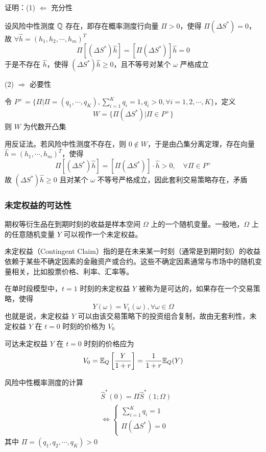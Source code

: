证明：(1) $\Leftarrow$ 充分性

设风险中性测度 $\mathbb{Q}$ 存在，即存在概率测度行向量 $\Pi>0$，使得 $\Pi(\Delta S^*)=0$，故 $\forall \hat{h}=(h_1,h_2,\cdots,h_m)^T$
\[
\Pi[(\Delta S^*)\hat{h}]=[\Pi(\Delta S^*)]\hat{h}=0
\]
于是不存在 $\hat{h}$，使得 $(\Delta S^*)\hat{h}\geq 0$，且不等号对某个 $\omega$ 严格成立

(2) $\Rightarrow$ 必要性

令 $P^+=\{\Pi|\Pi=(q_1,\cdots,q_K),\sum_{i=1}^Kq_i=1,q_i>0,\forall i=1,2,\cdots,K\}$，定义
\[
W=\{\Pi(\Delta S^*)|\Pi\in P^+\}
\]
则 $W$ 为代数开凸集

用反证法。若风险中性测度不存在，则 $0\notin W$，于是由凸集分离定理，存在向量 $\hat{h}=(h_1,\cdots,h_m)^T$，使得
\[
\Pi[(\Delta S^*)\hat{h}]=[\Pi(\Delta S^*)]\cdot \hat{h}>0,\quad \forall \Pi\in P^+
\]
故 $(\Delta S^*)\hat{h}\geq 0$ 且对某个 $\omega$ 不等号严格成立，因此套利交易策略存在，矛盾

\subsubsection{未定权益的可达性}

期权等衍生品在到期时刻的收益是样本空间 $\Omega$ 上的一个随机变量。一般地，$\Omega$ 上的任意随机变量 $Y$ 可以视作一个未定权益。

\begin{definition}[未定权益]
    未定权益（Contingent Claim）指的是在未来某一时刻（通常是到期时刻）的收益依赖于某些不确定因素的金融资产或合约。这些不确定因素通常与市场中的随机变量相关，比如股票价格、利率、汇率等。
\end{definition}

\begin{definition}[可达性]
    在单时段模型中，$t=1$ 时刻的未定权益 $Y$ 被称为是可达的，如果存在一个交易策略，使得
    \[
    Y(\omega)=V_1(\omega),\forall \omega\in \Omega
    \]
    也就是说，未定权益 $Y$ 可以由该交易策略下的投资组合复制，故由无套利性，未定权益 $Y$ 在 $t=0$ 时刻的价格为 $V_0$
\end{definition}

\begin{theorem}
    可达未定权益 $Y$ 在 $t=0$ 时刻的价格应为
    \[
    V_0=\mathbb E_Q\left[\frac{Y}{1+r}\right]=\frac{1}{1+r}\mathbb E_Q(Y)
    \]
\end{theorem}

风险中性概率测度的计算
\[
\begin{aligned}
    &\hat{S}^*(0)=\Pi\hat{S}^*(1;\Omega)\\
    &\Leftrightarrow \begin{cases}
        \sum_{i=1}^K q_i=1\\
        \Pi(\Delta S^*)=0
    \end{cases}
\end{aligned}
\]
其中 $\Pi=(q_1,q_2,\cdots,q_K)>0$

